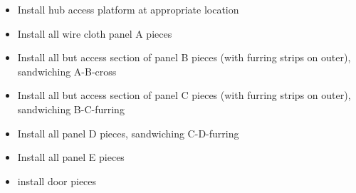 \documentclass[11pt]{article}
\begin{document}
\begin{itemize}
\item Install hub access platform at appropriate location
\item Install all wire cloth panel A pieces
\item Install all but access section of panel B pieces (with furring strips on outer), sandwiching A-B-cross
\item Install all but access section of panel C pieces (with furring strips on outer), sandwiching B-C-furring
\item Install all panel D pieces, sandwiching C-D-furring
\item Install all panel E pieces
\item install door pieces
\end{itemize}



\end{document}
